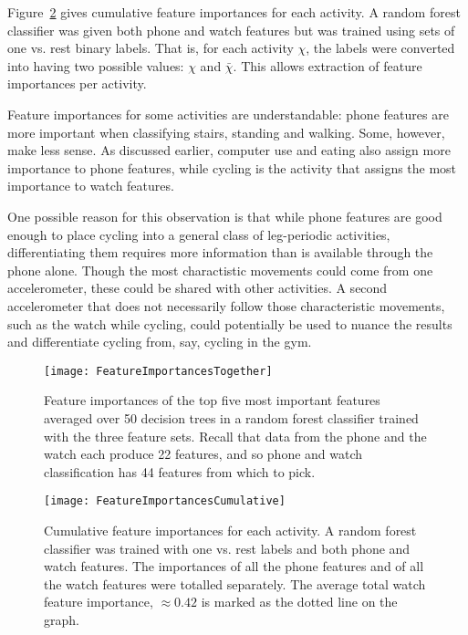 {{    Figure~\ref{fig:FeatureImportancesCumulative} gives cumulative feature importances for each activity. A random forest classifier was given both phone and watch features but was trained using sets of one vs. rest binary labels. That is, for each activity $\chi$, the labels were converted into having two possible values: $\chi$ and $\bar{\chi}$. This allows extraction of feature importances per activity.
    
    Feature importances for some activities are understandable: phone features are more important when classifying stairs, standing and walking. Some, however, make less sense. As discussed earlier, computer use and eating also assign more importance to phone features, while cycling is the activity that assigns the most importance to watch features.
    
    One possible reason for this observation is that while phone features are good enough to place cycling into a general class of leg-periodic activities, differentiating them requires more information than is available through the phone alone. Though the most charactistic movements could come from one accelerometer, these could be shared with other activities. A second accelerometer that does not necessarily follow those characteristic movements, such as the watch while cycling, could potentially be used to nuance the results and differentiate cycling from, say, cycling in the gym.
    
    \begin{figure}
      \centering
      \texttt{[image: FeatureImportancesTogether]}
      \caption{Feature importances of the top five most important features averaged over 50 decision trees in a random forest classifier trained with the three feature sets. Recall that data from the phone and the watch each produce 22 features, and so phone and watch classification has 44 features from which to pick.}
      \label{fig:FeatureImportancesTogether}
    \end{figure}
    
    \begin{figure}
      \centering
      \texttt{[image: FeatureImportancesCumulative]}
      \caption{Cumulative feature importances for each activity. A random forest classifier was trained with one vs. rest labels and both phone and watch features. The importances of all the phone features and of all the watch features were totalled separately. The average total watch feature importance, $\approx 0.42$ is marked as the dotted line on the graph.}
      \label{fig:FeatureImportancesCumulative}
    \end{figure}
}}
